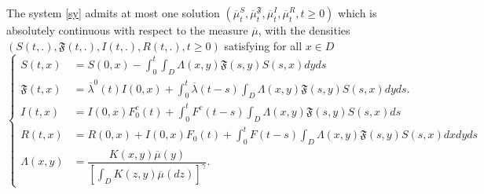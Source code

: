 \documentclass[10pt,a4paper]{amsart}
\begin{document}
\begin{propo}
	\label{oo}
	The  system \eqref{sy} admits at most one  solution  $\left(\overline{\mu}^S_t,\overline{\mu}_t^{\mathfrak{F}},\overline{\mu}_t^{I},\overline{\mu}_t^{R}, t \geq 0\right)$   which is absolutely continuous with respect to the measure $\overline{\mu}$, with the densities $\left(S(t,.),\mathfrak{F}(t,.),I(t,.) ,R(t,.), t\geq 0\right)$ satisfying for all $x\in D$
	\begin{equation}
	\label{syste}
	\left\lbrace
	\begin{aligned}
	S(t,x)&= S(0,x)- \int_0^t\int_{D} \Lambda(x,y)\mathfrak{F}(s,y)S(s,x)dyds\\
	\mathfrak{F}(t,x) &=\overline{\lambda}^0(t)I(0,x)+\int_0^t\overline{\lambda}(t-s)\int_{D} \Lambda(x,y)\mathfrak{F}(s,y)S(s,x)dyds.\\
	I(t,x)&= I(0,x)F_0^c(t)+\int_0^t F^c(t-s)\int_{D} \Lambda(x,y)\mathfrak{F}(s,y)S(s,x)ds\\
	R(t,x)&= R(0,x)+I(0,x)F_0(t)+\int_0^tF(t-s) \int_{D} \Lambda(x,y)\mathfrak{F}(s,y)S(s,x)dxdyds\\
\Lambda(x,y)&=\dfrac{K(x,y)\overline{\mu}(y)}{\left[\displaystyle\int_{D}K(z,y)\overline{\mu}(dz) \right]^{\gamma}}.
	\end{aligned}
	\right.
	\end{equation}
\end{propo}
\end{document}
